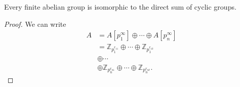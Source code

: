 \begin{corol}
Every finite abelian group is isomorphic to the direct sum of cyclic groups.
\end{corol}
\begin{proof}
We can write
\begin{align*}
A &= A[p_1^\infty] \oplus \cdots \oplus A[p_n^\infty] \\
  &=      \mathbb{Z}_{p_1^{r_{11}}} \oplus \cdots \oplus \mathbb{Z}_{p_1^{r_{1k}}} \\
  &\oplus \cdots \\
  &\oplus \mathbb{Z}_{p_n^{r_{n1}}} \oplus \cdots \oplus \mathbb{Z}_{p_n^{r_{nk}}}.
\end{align*}
\end{proof}